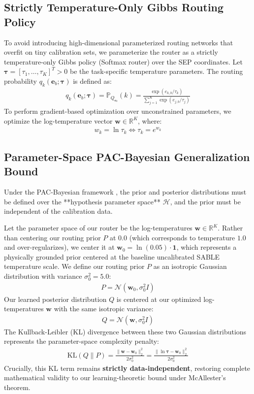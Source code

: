 \subsection{Strictly Temperature-Only Gibbs Routing Policy}
To avoid introducing high-dimensional parameterized routing networks that overfit on tiny calibration sets, we parameterize the router as a strictly temperature-only Gibbs policy (Softmax router) over the SEP coordinates. Let $\boldsymbol{\tau} = [\tau_1, \dots, \tau_K]^T > 0$ be the task-specific temperature parameters. The routing probability $q_k(\mathbf{e}_b; \boldsymbol{\tau})$ is defined as:
\begin{align}
    q_k(\mathbf{e}_b; \boldsymbol{\tau}) = \mathbb{P}_{Q_{\mathbf{e}_b}}(k) = \frac{\exp\left( e_{k, b} / \tau_k \right)}{\sum_{j=1}^K \exp\left( e_{j, b} / \tau_j \right)}
\end{align}
To perform gradient-based optimization over unconstrained parameters, we optimize the log-temperature vector $\mathbf{w} \in \mathbb{R}^K$, where:
\begin{align}
    w_k = \ln \tau_k \iff \tau_k = e^{w_k}
\end{align}

\subsection{Parameter-Space PAC-Bayesian Generalization Bound}
Under the PAC-Bayesian framework \cite{mcallester1999pac}, the prior and posterior distributions must be defined over the **hypothesis parameter space** $\mathcal{H}$, and the prior must be independent of the calibration data. 

Let the parameter space of our router be the log-temperatures $\mathbf{w} \in \mathbb{R}^K$. Rather than centering our routing prior $P$ at $0.0$ (which corresponds to temperature $1.0$ and over-regularizes), we center it at $\mathbf{w}_0 = \ln(0.05) \cdot \mathbf{1}$, which represents a physically grounded prior centered at the baseline uncalibrated SABLE temperature scale. We define our routing prior $P$ as an isotropic Gaussian distribution with variance $\sigma_0^2 = 5.0$:
\begin{align}
    P = \mathcal{N}(\mathbf{w}_0, \sigma_0^2 I)
\end{align}
Our learned posterior distribution $Q$ is centered at our optimized log-temperatures $\mathbf{w}$ with the same isotropic variance:
\begin{align}
    Q = \mathcal{N}(\mathbf{w}, \sigma_0^2 I)
\end{align}
The Kullback-Leibler (KL) divergence between these two Gaussian distributions represents the parameter-space complexity penalty:
\begin{align}
    \text{KL}(Q \| P) = \frac{\|\mathbf{w} - \mathbf{w}_0\|_2^2}{2 \sigma_0^2} = \frac{\|\ln \boldsymbol{\tau} - \mathbf{w}_0\|_2^2}{2 \sigma_0^2}
\end{align}
Crucially, this KL term remains \textbf{strictly data-independent}, restoring complete mathematical validity to our learning-theoretic bound under McAllester's theorem.

